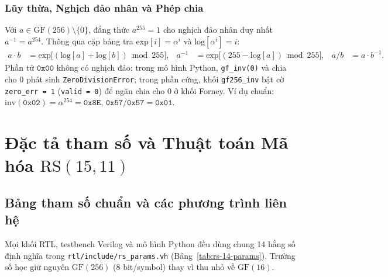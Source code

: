 \documentclass[11pt,a4paper]{report}
\begin{document}
\subsubsection{Lũy thừa, Nghịch đảo nhân và Phép chia}
Với $a \in \text{GF}(256) \setminus \{0\}$, đẳng thức $a^{255} = 1$ cho nghịch đảo nhân duy nhất $a^{-1} = a^{254}$. Thông qua cặp bảng tra $\text{exp}[i] = \alpha^i$ và $\text{log}[\alpha^i] = i$:
\begin{align}
    a \cdot b &= \text{exp}\bigl[(\text{log}[a] + \text{log}[b]) \bmod 255\bigr], &
    a^{-1}    &= \text{exp}\bigl[(255 - \text{log}[a]) \bmod 255\bigr], &
    a / b     &= a \cdot b^{-1}.
    \label{eq:gf-inv-lut}
\end{align}
Phần tử $\texttt{0x00}$ không có nghịch đảo: trong mô hình Python, \texttt{gf\_inv(0)} và chia cho $0$ phát sinh \texttt{ZeroDivisionError}; trong phần cứng, khối \texttt{gf256\_inv} bật cờ \texttt{zero\_err = 1} (\texttt{valid = 0}) để ngăn chia cho $0$ ở khối Forney. Ví dụ chuẩn: $\text{inv}(\texttt{0x02}) = \alpha^{254} = \texttt{0x8E}$, $\texttt{0x57}/\texttt{0x57} = \texttt{0x01}$.

\section{Đặc tả tham số và Thuật toán Mã hóa \texorpdfstring{$\text{RS}(15,11)$}{RS(15,11)}}

\subsection{Bảng tham số chuẩn và các phương trình liên hệ}

Mọi khối RTL, testbench Verilog và mô hình Python đều dùng chung 14 hằng số định nghĩa trong \texttt{rtl/include/rs\_params.vh} (Bảng~\ref{tab:rs-14-params}). Trường số học giữ nguyên $\text{GF}(256)$ ($8\text{ bit}$/symbol) thay vì thu nhỏ về $\text{GF}(16)$.
\end{document}
